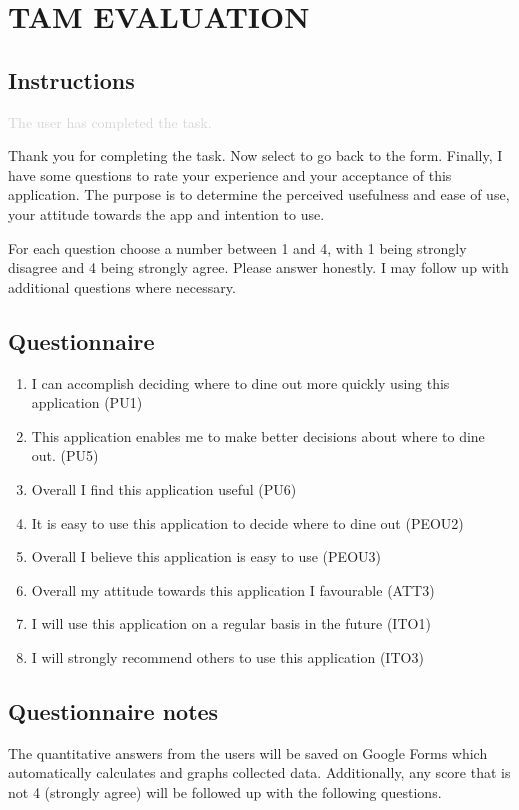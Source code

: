 \section*{TAM EVALUATION}
    \subsection*{Instructions}
        \textcolor{lightgray}{The user has completed the task.}

        \begin{itshape}
            Thank you for completing the task. Now select to go back to the form. Finally, I have some questions to rate your experience and your  acceptance of this application. The purpose is to determine the perceived usefulness and ease of use, your attitude towards the app and intention to use.

            For each question choose a number between 1 and 4, with 1 being strongly disagree and 4 being strongly agree. Please answer honestly. I may follow up with additional questions where necessary. 
        \end{itshape}

    \subsection*{Questionnaire}
        \begin{enumerate}
            \item I can accomplish deciding where to dine out more quickly using this application (PU1)
            \item This application enables me to make better decisions about where to dine out. (PU5)
            \item Overall I find this application useful (PU6)
            \item It is easy to use this application to decide where to dine out (PEOU2)
            \item Overall I believe this application is easy to use (PEOU3)
            \item Overall my attitude towards this application I favourable (ATT3)
            \item I will use this application on a regular basis in the future (ITO1)
            \item I will strongly recommend others to use this application (ITO3)
        \end{enumerate}

    \subsection*{Questionnaire notes}
        The quantitative answers from the users will be saved on Google Forms which automatically calculates and graphs collected data. Additionally, any score that is not 4 (strongly agree) will be followed up with the following questions.

